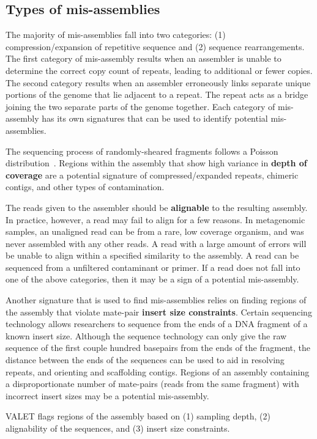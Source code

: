 \documentclass[12pt,\mydriver]{thesis}
\begin{document}
\subsection{Types of mis-assemblies}

The majority of mis-assemblies fall into two categories: (1) compression/expansion of repetitive sequence and (2) sequence rearrangements.
The first category of mis-assembly results when an assembler is unable to determine the correct copy count of repeats, leading to additional or fewer copies.
The second category results when an assembler erroneously links separate unique portions of the genome that lie adjacent to a repeat.
The repeat acts as a bridge joining the two separate parts of the genome together.
Each category of mis-assembly has its own signatures that can be used to identify potential mis-assemblies.

The sequencing process of randomly-sheared fragments follows a Poisson distribution~\cite{lander1988genomic}.
Regions within the assembly that show high variance in \textbf{depth of coverage} are a potential signature of compressed/expanded repeats, chimeric contigs, and other types of contamination.

The reads given to the assembler should be \textbf{alignable} to the resulting assembly.
In practice, however, a read may fail to align for a few reasons.
In metagenomic samples, an unaligned read can be from a rare, low coverage organism, and was never assembled with any other reads.
A read with a large amount of errors will be unable to align within a specified similarity to the assembly.
A read can be sequenced from a unfiltered contaminant or primer.
If a read does not fall into one of the above categories, then it may be a sign of a potential mis-assembly.

Another signature that is used to find mis-assemblies relies on finding regions of the assembly that violate mate-pair \textbf{insert size constraints}.
Certain sequencing technology allows researchers to sequence from the ends of a DNA fragment of a known insert size.
Although the sequence technology can only give the raw sequence of the first couple hundred basepairs from the ends of the fragment, the distance between the ends of the sequences can be used to aid in resolving repeats, and orienting and scaffolding contigs.
Regions of an assembly containing a disproportionate number of mate-pairs (reads from the same fragment) with incorrect insert sizes may be a potential mis-assembly.

VALET flags regions of the assembly based on (1) sampling depth, (2) alignability of the sequences, and (3) insert size constraints.
\end{document}
